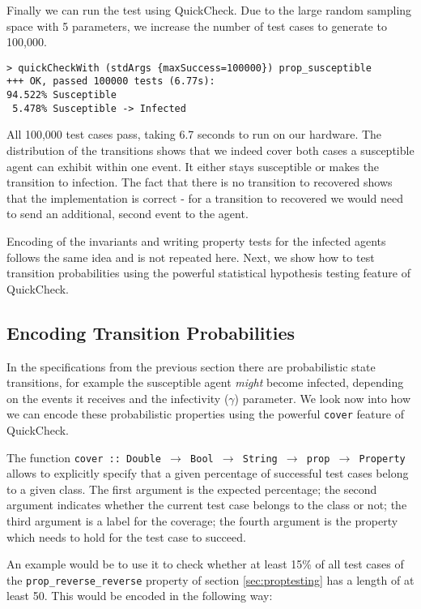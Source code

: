 Finally we can run the test using QuickCheck. Due to the large random sampling space with 5 parameters, we increase the number of test cases to generate to 100,000.

\begin{footnotesize}
\begin{verbatim}
> quickCheckWith (stdArgs {maxSuccess=100000}) prop_susceptible
+++ OK, passed 100000 tests (6.77s):
94.522% Susceptible
 5.478% Susceptible -> Infected
\end{verbatim}
\end{footnotesize}

All 100,000 test cases pass, taking 6.7 seconds to run on our hardware. The distribution of the transitions shows that we indeed cover both cases a susceptible agent can exhibit within one event. It either stays susceptible or makes the transition to infection. The fact that there is no transition to recovered shows that the implementation is correct - for a transition to recovered we would need to send an additional, second event to the agent.

Encoding of the invariants and writing property tests for the infected agents follows the same idea and is not repeated here. Next, we show how to test transition probabilities using the powerful statistical hypothesis testing feature of QuickCheck.

\subsection{Encoding Transition Probabilities}
In the specifications from the previous section there are probabilistic state transitions, for example the susceptible agent \textit{might} become infected, depending on the events it receives and the infectivity ($\gamma$) parameter. We look now into how we can encode these probabilistic properties using the powerful \texttt{cover} feature of QuickCheck.

The function \texttt{cover :: Double $\rightarrow$ Bool $\rightarrow$ String $\rightarrow$ prop $\rightarrow$ Property} allows to explicitly specify that a given percentage of successful test cases belong to a given class. The first argument is the expected percentage; the second argument indicates whether the current test case belongs to the class or not; the third argument is a label for the coverage; the fourth argument is the property which needs to hold for the test case to succeed.

An example would be to use it to check whether at least 15\% of all test cases of the \texttt{prop\_reverse\_reverse} property of section \ref{sec:proptesting} has a length of at least 50. This would be encoded in the following way:

